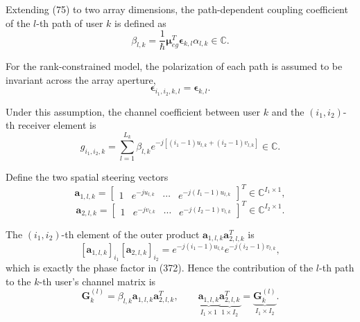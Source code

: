 \documentclass[12pt,a4paper]{article}
\begin{document}
Extending (75) to two array dimensions, the path-dependent coupling
coefficient of the $l$-th path of user $k$ is defined as
\begin{equation}
\boxed{
 \beta_{l,k}
 =
 \frac{1}{\hbar}
 \boldsymbol{\mu}_{eg}^{T}
 \boldsymbol{\epsilon}_{k,l}
 \alpha_{l,k}
 \in\mathbb C.
}
\tag{373}
\end{equation}

For the rank-constrained model, the polarization of each path is
assumed to be invariant across the array aperture,
\begin{equation}
\boxed{
 \boldsymbol{\epsilon}_{i_1,i_2,k,l}
 =
 \boldsymbol{\epsilon}_{k,l}.
}
\tag{374}
\end{equation}

Under this assumption, the channel coefficient between user $k$ and the
$(i_1,i_2)$-th receiver element is
\begin{equation}
\boxed{
 g_{i_1,i_2,k}
 =
 \sum_{l=1}^{L_k}
 \beta_{l,k}
 e^{-j[(i_1-1)u_{l,k}+(i_2-1)v_{l,k}]}
 \in\mathbb C.
}
\tag{375}
\end{equation}

Define the two spatial steering vectors
\begin{equation}
\mathbf a_{1,l,k}
 =
 \begin{bmatrix}
 1 & e^{-ju_{l,k}} & \cdots & e^{-j(I_1-1)u_{l,k}}
 \end{bmatrix}^{T}
 \in\mathbb C^{I_1\times1},
\tag{376}
\end{equation}
\begin{equation}
\mathbf a_{2,l,k}
 =
 \begin{bmatrix}
 1 & e^{-jv_{l,k}} & \cdots & e^{-j(I_2-1)v_{l,k}}
 \end{bmatrix}^{T}
 \in\mathbb C^{I_2\times1}.
\tag{377}
\end{equation}

The $(i_1,i_2)$-th element of the outer product
$\mathbf a_{1,l,k}\mathbf a_{2,l,k}^{T}$ is
\[
[\mathbf a_{1,l,k}]_{i_1}[\mathbf a_{2,l,k}]_{i_2}
=
e^{-j(i_1-1)u_{l,k}}e^{-j(i_2-1)v_{l,k}},
\]
which is exactly the phase factor in (372). Hence the contribution of
the $l$-th path to the $k$-th user's channel matrix is
\begin{equation}
\mathbf G_k^{(l)}
 =
 \beta_{l,k}
 \mathbf a_{1,l,k}\mathbf a_{2,l,k}^{T},
 \qquad
 \underbrace{\mathbf a_{1,l,k}}_{I_1\times1}
 \underbrace{\mathbf a_{2,l,k}^{T}}_{1\times I_2}
 =
 \underbrace{\mathbf G_k^{(l)}}_{I_1\times I_2}.
\tag{378}
\end{equation}
\end{document}
